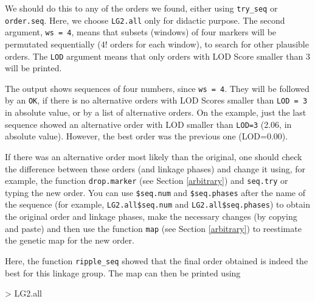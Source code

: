\documentclass[letterpaper,12pt,oneside]{article}
\begin{document}
\begin{enumerate}
We should do this to any of the orders we found, either using {\tt try_seq} or {\tt order.seq}. Here, we choose {\tt LG2.all} only for didactic purpose. The second argument, {\tt ws = 4}, means that subsets (windows) of four markers will be permutated sequentially ({\tt $4!$} orders for each window), to search for other plausible orders. The {\tt LOD} argument means that only orders with LOD Score smaller than 3 will be printed.

The output shows sequences of four numbers, since {\tt ws = 4}.  They will be followed by an {\tt OK}, if there is no alternative orders with LOD Scores smaller than {\tt LOD = 3} in absolute value, or by a list of alternative orders. On the example, just the last sequence showed an alternative order with LOD smaller than {\tt LOD=3} (2.06, in absolute value). However, the best order was the previous one (LOD=0.00). 

If there was an alternative order most likely than the original, one should check the difference between these orders (and linkage phases) and change it using, for example, the function {\tt drop.marker} (see Section \ref{arbitrary}) and {\tt seq.try} or typing the new order. You can use {\tt \$seq.num} and {\tt \$seq.phases} after the name of the sequence (for example, {\tt LG2.all\$seq.num} and {\tt LG2.all\$seq.phases}) to obtain the original order and linkage phases, make the necessary changes (by copying and paste) and then use the function {\tt map} (see Section \ref{arbitrary}) to reestimate the genetic map for the new order.

Here, the function {\tt ripple_seq} showed that the final order obtained is indeed the best for this linkage group. The map can then be printed using  
    
\begin{Schunk}
\begin{Sinput}
> LG2.all
\end{Sinput}
\end{Schunk}

\end{enumerate}
\end{document}
